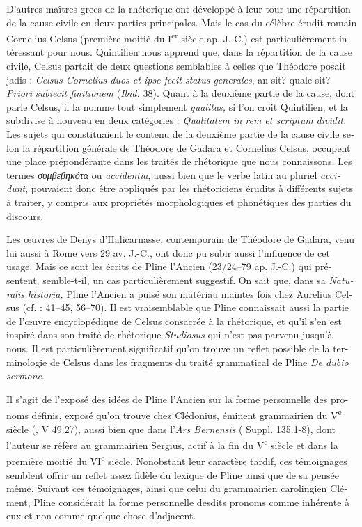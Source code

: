 \documentclass[output=paper]{langsci/langscibook}
\begin{document}
\begin{otherlanguage}{french}
D’autres maîtres grecs de la rhétorique ont développé à leur tour une répartition de la cause civile en deux parties principales. Mais le cas du célèbre érudit romain Cornelius Celsus (première moitié du I\textsuperscript{er} siècle ap. J.-C.) est particulièrement intéressant pour nous. Quintilien nous apprend que, dans la répartition de la cause civile, Celsus partait de deux questions semblables à celles que Théodore posait jadis : \textit{Celsus Cornelius duos et ipse fecit status generales}, an sit? quale sit? \textit{Priori subiecit finitionem} (\textit{Ibid.} 38). Quant à la deuxième partie de la cause, dont parle Celsus, il la nomme tout simplement \textit{qualitas,} si l’on croit Quintilien, et la subdivise à nouveau en deux catégories : \textit{Qualitatem in rem et scriptum dividit.} Les sujets qui constituaient le contenu de la deuxième partie de la cause civile selon la répartition générale de Théodore de Gadara et Cornelius Celsus, occupent une place prépondérante dans les traités de rhétorique que nous connaissons. Les termes \textit{συμβεβηκότα} ou \textit{accidentia}, aussi bien que le verbe latin au pluriel \textit{accidunt}, pouvaient donc être appliqués par les rhétoriciens érudits à différents sujets à traiter, y compris aux propriétés morphologiques et phonétiques des parties du discours.

Les œuvres de Denys d’Halicarnasse, contemporain de Théodore de Gadara, venu lui aussi à Rome vers 29 av. J.-C., ont donc pu subir aussi l’influence de cet usage. Mais ce sont les écrits de Pline l’Ancien (23/24–79 ap. J.-C.) qui présentent, semble-t-il, un cas particulièrement suggestif. On sait que, dans sa \textit{Naturalis historia,} Pline l’Ancien a puisé son matériau maintes fois chez Aurelius Celsus (cf. \citealt{munzer_beitrage_1897}: 41–45, 56–70). Il est vraisemblable que Pline connaissait aussi la partie de l’œuvre encyclopédique de Celsus consacrée à la rhétorique, et qu’il s’en est inspiré dans son traité de rhétorique \textit{Studiosus} qui n’est pas parvenu jusqu’à nous. Il est particulièrement significatif qu’on trouve un reflet possible de la terminologie de Celsus dans les fragments du traité grammatical de Pline \textit{De dubio sermone}.

Il s’agit de l’exposé des idées de Pline l’Ancien sur la forme personnelle des pronoms définis, exposé qu’on trouve chez Clédonius, éminent grammairien du V\textsuperscript{e} siècle (, V 49.27), aussi bien que dans l’\textit{Ars Bernensis} ( Suppl. 135.1-8), dont l’auteur se réfère au grammairien Sergius, actif à la fin du V\textsuperscript{e} siècle et dans la première moitié du VI\textsuperscript{e} siècle. Nonobstant leur caractère tardif, ces témoignages semblent offrir un reflet assez fidèle du lexique de Pline ainsi que de sa pensée même. Suivant ces témoignages, ainsi que celui du grammairien carolingien Clément, Pline considérait la forme personnelle desdits pronoms comme inhérente à eux et non comme quelque chose d’adjacent.


\end{otherlanguage}
\end{document}
